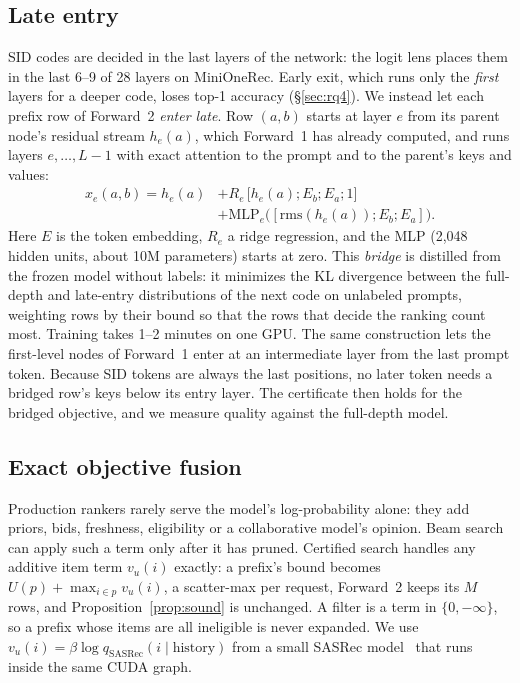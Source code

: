 \documentclass[sigconf,anonymous]{acmart}
\newcommand{\U}{U}
\begin{document}
\subsection{Late entry}
\label{sec:late}
SID codes are decided in the last layers of the network: the logit lens places them in the last 6--9 of 28 layers
on MiniOneRec. Early exit, which runs only the \emph{first} layers for a deeper code, loses top-1 accuracy
(\S\ref{sec:rq4}). We instead let each prefix row of Forward~2 \emph{enter late}. Row $(a,b)$ starts at layer $e$
from its parent node's residual stream $h_e(a)$, which Forward~1 has already computed, and runs layers
$e,\dots,L-1$ with exact attention to the prompt and to the parent's keys and values:
\begin{equation}
\begin{split}
x_e(a,b) = h_e(a) &+ R_e\,\bigl[h_e(a);E_b;E_a;1\bigr]\\
 &+ \mathrm{MLP}_e\bigl([\mathrm{rms}(h_e(a));E_b;E_a]\bigr).
\end{split}
\label{eq:bridge}
\end{equation}
Here $E$ is the token embedding, $R_e$ a ridge regression, and the MLP (2,048 hidden units, about 10M parameters)
starts at zero. This \emph{bridge} is distilled from the frozen model without labels: it minimizes the KL divergence
between the full-depth and late-entry distributions of the next code on unlabeled prompts, weighting rows by their
bound so that the rows that decide the ranking count most. Training takes 1--2 minutes on one GPU. The same
construction lets the first-level nodes of Forward~1 enter at an intermediate layer from the last prompt token.
Because SID tokens are always the last positions, no later token needs a bridged row's keys below its entry layer.
The certificate then holds for the bridged objective, and we measure quality against the full-depth model.

\subsection{Exact objective fusion}
\label{sec:fusion}
Production rankers rarely serve the model's log-probability alone: they add priors, bids, freshness, eligibility or
a collaborative model's opinion. Beam search can apply such a term only after it has pruned. Certified search
handles any additive item term $v_u(i)$ exactly: a prefix's bound becomes $\U(p)+\max_{i\in p}v_u(i)$, a
scatter-max per request, Forward~2 keeps its $M$ rows, and Proposition~\ref{prop:sound} is unchanged. A filter is a
term in $\{0,-\infty\}$, so a prefix whose items are all ineligible is never expanded. We use
$v_u(i)=\beta\log q_{\text{SASRec}}(i\mid\text{history})$ from a small SASRec model~\cite{kang2018} that runs inside
the same CUDA graph.
\end{document}
